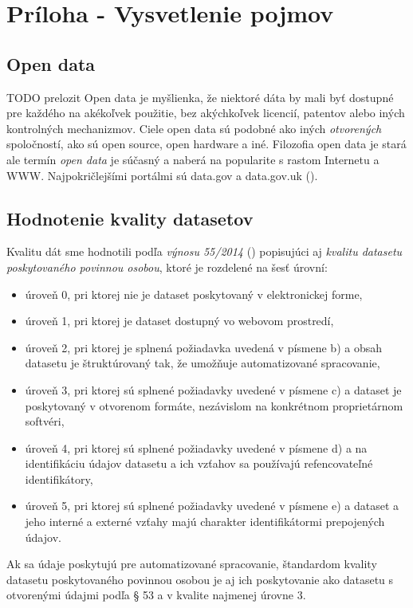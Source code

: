 \documentclass[12pt,a4paper]{article}
\begin{document}
\section*{Príloha - Vysvetlenie pojmov} 
\subsection*{Open data} 
\label{opendata} 
TODO prelozit 
Open data je myšlienka, že niektoré dáta by mali byť dostupné pre každého na akékoľvek použitie, bez akýchkoľvek licencií, patentov alebo iných kontrolných mechanizmov. Ciele open data sú podobné ako iných \emph{otvorených} spoločností, ako sú open source, open hardware a iné. Filozofia open data je stará ale termín \emph{open data} je súčasný a naberá na popularite s rastom Internetu a WWW. Najpokričlejšími portálmi sú data.gov a data.gov.uk (\cite{opendata-wiki}). 

\subsection*{Hodnotenie kvality datasetov}
\label{zakon-kvalita} 
Kvalitu dát sme hodnotili podľa \emph{výnosu 55/2014} (\cite{kvalita}) popisujúci aj \emph{kvalitu datasetu poskytovaného povinnou osobou}, ktoré je rozdelené na šesť úrovní: 
\begin{itemize} 
\item úroveň 0, pri ktorej nie je dataset poskytovaný
v elektronickej forme,
\item úroveň 1, pri ktorej je dataset dostupný vo webovom
prostredí,
\item úroveň 2, pri ktorej je splnená požiadavka uvedená
v písmene b) a obsah datasetu je štruktúrovaný tak,
že umožňuje automatizované spracovanie,
\item úroveň 3, pri ktorej sú splnené požiadavky uvedené
v písmene c) a dataset je poskytovaný v otvorenom
formáte, nezávislom na konkrétnom proprietárnom
softvéri,
\item úroveň 4, pri ktorej sú splnené požiadavky uvedené
v písmene d) a na identifikáciu údajov datasetu a ich
vzťahov sa používajú refencovateľné identifikátory,
\item úroveň 5, pri ktorej sú splnené požiadavky uvedené
v písmene e) a dataset a jeho interné a externé
vzťahy majú charakter identifikátormi prepojených
údajov.
\end{itemize} 

Ak sa údaje poskytujú pre automatizované spracovanie, štandardom kvality datasetu poskytovaného
povinnou osobou je aj ich poskytovanie ako datasetu s otvorenými údajmi podľa § 53 a v kvalite najmenej úrovne 3.
\end{document}
